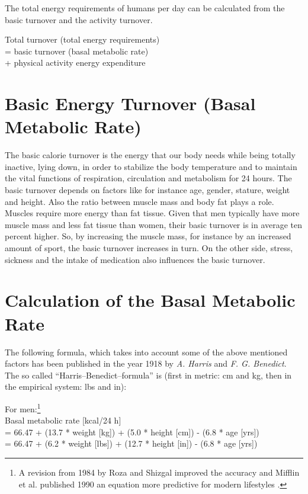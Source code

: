 \documentclass[../main.tex]{subfiles}
\begin{document}
The total energy requirements of humans per day can be calculated from the basic turnover and the activity turnover.

\vspace{2mm}

\begin{center}
\begin{fminipage}{7cm}
  Total turnover   (total energy requirements)\\
  = basic turnover (basal metabolic rate)\\
  + physical activity energy expenditure
\end{fminipage}
\end{center}

\vspace{2mm}

\section{Basic Energy Turnover (Basal Metabolic Rate)}

The basic calorie turnover is the energy that our body needs while being totally inactive, lying down, in order to
stabilize the body temperature and to maintain the vital functions of respiration, circulation and metabolism for 24 hours.
The basic turnover depends on factors like for instance age, gender, stature, weight and height.
Also the ratio between muscle mass and body fat plays a role.
Muscles require more energy than fat tissue.
Given that men typically have more muscle mass and less fat tissue than women, their basic turnover is in average ten percent higher.
So, by increasing the muscle mass, for instance by an increased amount of sport, the basic turnover increases in turn.
On the other side, stress, sickness and the intake of medication also influences the basic turnover.


\section{Calculation of the Basal Metabolic Rate}

The following formula, which takes into account some of the above mentioned factors has been published in the year 1918
by \textit{A. Harris} and \textit{F. G. Benedict}.
The so called ``Harris--Benedict--formula'' is (first in metric: cm and kg, then in the empirical system: lbs and in):

\noindent For men:\footnote{A revision from 1984 by {Roza} and {Shizgal} improved the accuracy and {Mifflin et al.}
 published 1990 an equation more predictive for modern lifestyles \cite{WikiCalorie}.}\\
Basal metabolic rate   [kcal/24 h] \\
= 66.47 + (13.7 * weight [kg]) + (5.0 * height [cm]) - (6.8 * age [yrs]) \\
= 66.47 + (6.2 * weight [lbs]) + (12.7 * height [in]) - (6.8 * age [yrs])
\end{document}
